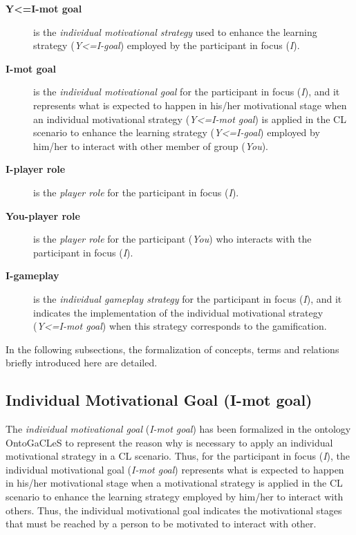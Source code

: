 \begin{description}
\item[\textbf{Y<=I-mot goal}]
is the \emph{individual motivational strategy} used to enhance the learning strategy (\emph{Y<=I-goal}) employed by the participant in focus (\emph{I}).

\item[\textbf{I-mot goal}]
is the \emph{individual motivational goal} for the participant in focus (\emph{I}), and it represents what is expected to happen in his/her motivational stage when an individual motivational strategy (\emph{Y<=I-mot goal}) is applied in the CL scenario to enhance the learning strategy (\emph{Y<=I-goal}) employed by him/her to interact with other member of group (\emph{You}).

\item[\textbf{I-player role}]
is the \emph{player role} for the participant in focus (\emph{I}).

\item[\textbf{You-player role}]
is the \emph{player role} for the participant (\emph{You}) who interacts with the participant in focus (\emph{I}).

\item[\textbf{I-gameplay}]
is the \emph{individual gameplay strategy} for the participant in focus (\emph{I}), and it indicates the implementation of the individual motivational strategy (\emph{Y<=I-mot goal}) when this strategy corresponds to the gamification.
\end{description}

In the following subsections, the formalization of concepts, terms and relations briefly introduced here are detailed.

\subsection{Individual Motivational Goal (I-mot goal)}
\label{subsec:individual-motivational-goal}

The \emph{individual motivational goal} (\emph{I-mot goal}) has been formalized in the ontology OntoGaCLeS to represent the reason why is necessary to apply an individual motivational strategy in a CL scenario.
Thus, for the participant in focus (\emph{I}), the individual motivational goal (\emph{I-mot goal}) represents what is expected to happen in his/her motivational stage when a motivational strategy is applied in the CL scenario to enhance the learning strategy employed by him/her to interact with others.
Thus, the individual motivational goal indicates the motivational stages that must be reached by a person to be motivated to interact with other.

